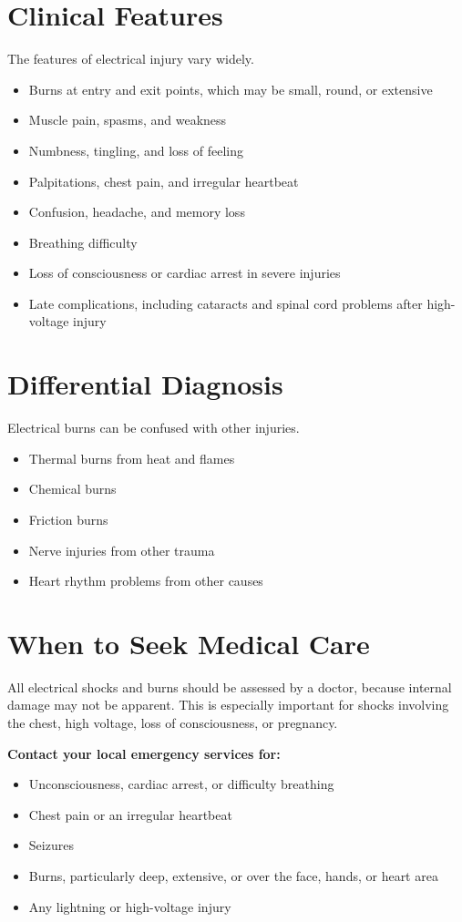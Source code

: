 \section*{Clinical Features}
The features of electrical injury vary widely.
\begin{itemize}
    \item Burns at entry and exit points, which may be small, round, or extensive
    \item Muscle pain, spasms, and weakness
    \item Numbness, tingling, and loss of feeling
    \item Palpitations, chest pain, and irregular heartbeat
    \item Confusion, headache, and memory loss
    \item Breathing difficulty
    \item Loss of consciousness or cardiac arrest in severe injuries
    \item Late complications, including cataracts and spinal cord problems after high-voltage injury
\end{itemize}

\section*{Differential Diagnosis}
Electrical burns can be confused with other injuries.
\begin{itemize}
    \item Thermal burns from heat and flames
    \item Chemical burns
    \item Friction burns
    \item Nerve injuries from other trauma
    \item Heart rhythm problems from other causes
\end{itemize}

\section*{When to Seek Medical Care}
All electrical shocks and burns should be assessed by a doctor, because internal damage may not be apparent. This is especially important for shocks involving the chest, high voltage, loss of consciousness, or pregnancy.

\textbf{Contact your local emergency services for:}
\begin{itemize}
    \item Unconsciousness, cardiac arrest, or difficulty breathing
    \item Chest pain or an irregular heartbeat
    \item Seizures
    \item Burns, particularly deep, extensive, or over the face, hands, or heart area
    \item Any lightning or high-voltage injury
\end{itemize}

